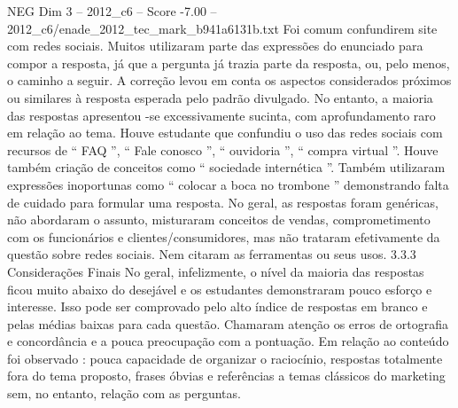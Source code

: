 \begin{textsample}{NEG Dim 3 – 2012\_c6 – Score -7.00 – 2012\_c6/enade\_2012\_tec\_mark\_b941a6131b.txt}
Foi comum confundirem site com redes sociais.
Muitos utilizaram parte das expressões do enunciado para compor a resposta, já que a pergunta já trazia parte da resposta, ou, pelo menos, o caminho a seguir.
A correção levou em conta os aspectos considerados próximos ou similares à resposta esperada pelo padrão divulgado.
No entanto, a maioria das respostas apresentou -se excessivamente sucinta, com aprofundamento raro em relação ao tema.
Houve estudante que confundiu o uso das redes sociais com recursos de “ FAQ ”, “ Fale conosco ”, “ ouvidoria ”, “ compra virtual ”.
Houve também criação de conceitos como “ sociedade internética ”.
Também utilizaram expressões inoportunas como “ colocar a boca no trombone ” demonstrando falta de cuidado para formular uma resposta.
No geral, as respostas foram genéricas, não abordaram o assunto, misturaram conceitos de vendas, comprometimento com os funcionários e clientes/consumidores, mas não trataram efetivamente da questão sobre redes sociais.
Nem citaram as ferramentas ou seus usos. 3.3.3 Considerações Finais No geral, infelizmente, o nível da maioria das respostas ficou muito abaixo do desejável e os estudantes demonstraram pouco esforço e interesse.
Isso pode ser comprovado pelo alto índice de respostas em branco e pelas médias baixas para cada questão.
Chamaram atenção os erros de ortografia e concordância e a pouca preocupação com a pontuação.
Em relação ao conteúdo foi observado : pouca capacidade de organizar o raciocínio, respostas totalmente fora do tema proposto, frases óbvias e referências a temas clássicos do marketing sem, no entanto, relação com as perguntas.

\end{textsample}
